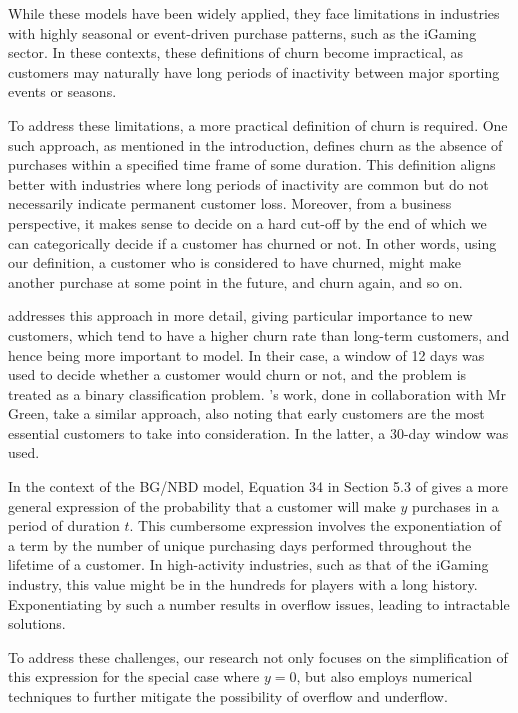 While these models have been widely applied, they face limitations in industries with highly seasonal or event-driven purchase patterns, such as the iGaming sector. In these contexts, these definitions of churn become impractical, as customers may naturally have long periods of inactivity between major sporting events or seasons. 

To address these limitations, a more practical definition of churn is required. One such approach, as mentioned in the introduction, defines churn as the absence of purchases within a specified time frame of some duration. This definition aligns better with industries where long periods of inactivity are common but do not necessarily indicate permanent customer loss. Moreover, from a business perspective, it makes sense to decide on a hard cut-off by the end of which we can categorically decide if a customer has churned or not. In other words, using our definition, a customer who is considered to have churned, might make another purchase at some point in the future, and churn again, and so on.

\cite{borg} addresses this approach in more detail, giving particular importance to new customers, which tend to have a higher churn rate than long-term customers, and hence being more important to model. In their case, a window of 12 days was used to decide whether a customer would churn or not, and the problem is treated as a binary classification problem. \cite{mrgreen}'s work, done in collaboration with Mr Green, take a similar approach, also noting that early customers are the most essential customers to take into consideration. In the latter, a 30-day window was used.

In the context of the BG/NBD model, Equation 34 in Section 5.3 of \cite{bgnbd_hardie_notes} gives a more general expression of the probability that a customer will make $y$ purchases in a period of duration $t$. This cumbersome expression involves the exponentiation of a term by the number of unique purchasing days performed throughout the lifetime of a customer. In high-activity industries, such as that of the iGaming industry, this value might be in the hundreds for players with a long history. Exponentiating by such a number results in overflow issues, leading to intractable solutions. 

To address these challenges, our research not only focuses on the simplification of this expression for the special case where $y=0$, but also employs numerical techniques to further mitigate the possibility of overflow and underflow. 

